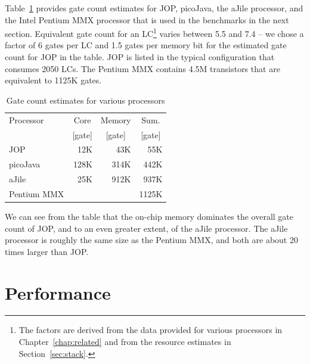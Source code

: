 %

Table~\ref{tab:results:gate:count} provides gate count estimates for
JOP, picoJava, the aJile processor, and the Intel Pentium MMX
processor that is used in the benchmarks in the next section.
Equivalent gate count for an LC\footnote{The factors are derived
from the data provided for various processors in
Chapter~\ref{chap:related} and from the resource estimates in
Section~\ref{sec:stack}.} varies between 5.5 and 7.4 -- we chose a
factor of 6 gates per LC and 1.5 gates per memory bit for the
estimated gate count for JOP in the table. JOP is listed in the
typical configuration that consumes 2050 LCs. The Pentium MMX
contains 4.5M transistors \cite{pentium:mmx} that are equivalent to
1125K gates.

\begin{table}
    \centering
    \begin{tabular}{lrrr}
        \toprule
        Processor & \multicolumn{1}{c}{Core} & \multicolumn{1}{c}{Memory} & \multicolumn{1}{c}{Sum.} \\
        & \multicolumn{1}{c}{[gate]} & \multicolumn{1}{c}{[gate]} & \multicolumn{1}{c}{[gate]}\\
        \midrule
        JOP & 12K & 43K & 55K\\
        picoJava & 128K & 314K & 442K\\
        aJile & 25K & 912K & 937K\\
        Pentium MMX & & & 1125K\\
        \bottomrule
    \end{tabular}
    \caption{Gate count estimates for various processors}
    \label{tab:results:gate:count}
\end{table}

We can see from the table that the on-chip memory dominates the
overall gate count of JOP, and to an even greater extent, of the
aJile processor. The aJile processor is roughly the same size as the
Pentium MMX, and both are about 20 times larger than JOP.


\section{Performance}
\label{sec:performance}

